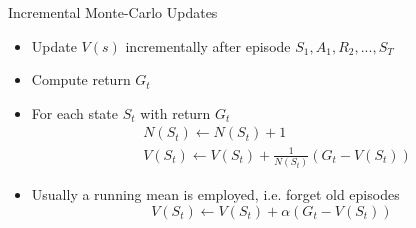\bgroup
\begin{frame}{Incremental Monte-Carlo Updates}
\begin{itemize}
\item Update $V(s)$ incrementally after episode $S_1, A_1, R_2, ..., S_T$
\item Compute return $G_t$
\item For each state $S_t$ with return $G_t$
\begin{align*}
&N(S_t) \leftarrow N(S_t) + 1 \\
&V(S_t) \leftarrow V(S_t) + \frac{1}{N(S_t)}(G_t − V(S_t))
\end{align*}
\item Usually a running mean is employed, i.e. forget old episodes
\begin{equation*}
V(S_t) \leftarrow V(S_t) + \alpha(G_t − V(S_t))
\end{equation*}
\end{itemize}
\end{frame}
\egroup